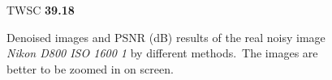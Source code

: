 \begin{figure}[t!]
{\begin{minipage}[t]{0.19\textwidth}
{\footnotesize TWSC \textbf{39.18}}
\end{minipage}
}\vspace{-3mm}
    \caption{Denoised images and PSNR (dB) results of the real noisy image \textsl{Nikon D800 ISO 1600 1} \cite{crosschannel2016} by different methods.\ The images are better to be zoomed in on screen.}
    \label{fig5-13}
\end{figure}


\begin{figure}[t!]
    \centering
{}
\end{figure}
